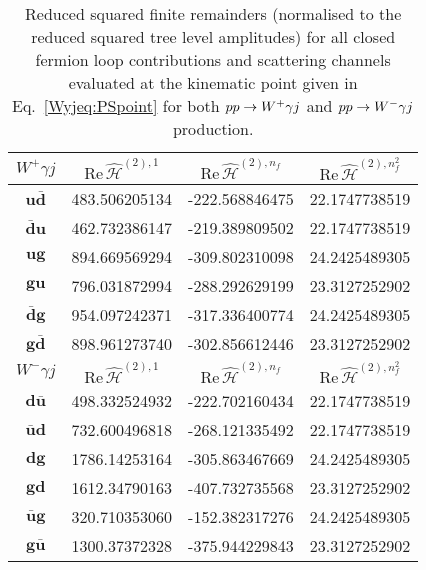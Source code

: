 \documentclass[main.tex]{subfiles}
\begin{document}
\begin{table}[t!]
\centering
\begin{tabularx}{1.0\textwidth}{|C{0.4}|C{1.2}|C{1.2}|C{1.2}|}
\hline
$W^+ \gamma j $ & $\mathrm{Re}\,\hat{\mathcal{H}}^{(2),1}$ & $\mathrm{Re}\,\hat{\mathcal{H}}^{(2),n_f}$ & $\mathrm{Re}\,\hat{\mathcal{H}}^{(2),n_f^2}$ \\
\hline
$\mathbf{u\bar{d}}$  & 483.506205134 & -222.568846475 & 22.1747738519  \\
$\mathbf{\bar{d}u}$  & 462.732386147 & -219.389809502 & 22.1747738519  \\
$\mathbf{ug}      $  & 894.669569294 & -309.802310098 & 24.2425489305  \\
$\mathbf{gu}      $  & 796.031872994 & -288.292629199 & 23.3127252902  \\
$\mathbf{\bar{d}g}$  & 954.097242371 & -317.336400774 & 24.2425489305  \\
$\mathbf{g\bar{d}}$  & 898.961273740 & -302.856612446 & 23.3127252902  \\
\hline
\hline
$W^- \gamma j $ & $\mathrm{Re}\,\hat{\mathcal{H}}^{(2),1}$ & $\mathrm{Re}\,\hat{\mathcal{H}}^{(2),n_f}$ & $\mathrm{Re}\,\hat{\mathcal{H}}^{(2),n_f^2}$ \\
\hline
$\mathbf{d\bar{u}}$  & 498.332524932 & -222.702160434 & 22.1747738519  \\ 
$\mathbf{\bar{u}d}$  & 732.600496818 & -268.121335492 & 22.1747738519  \\
$\mathbf{dg}      $  & 1786.14253164 & -305.863467669 & 24.2425489305  \\
$\mathbf{gd}      $  & 1612.34790163 & -407.732735568 & 23.3127252902  \\
$\mathbf{\bar{u}g}$  & 320.710353060 & -152.382317276 & 24.2425489305  \\
$\mathbf{g\bar{u}}$  & 1300.37372328 & -375.944229843 & 23.3127252902  \\
\hline
\end{tabularx}
\caption{\label{Wyjtab:benchmarkfinremsq2L} 
Reduced squared finite remainders (normalised to the reduced squared tree level amplitudes) for all closed fermion loop contributions and scattering channels
evaluated at the kinematic point given in Eq.~\ref{Wyjeq:PSpoint} for both $pp\to W^+\gamma j$ and $pp\to W^-\gamma j$ production.
}
\end{table}
\end{document}
